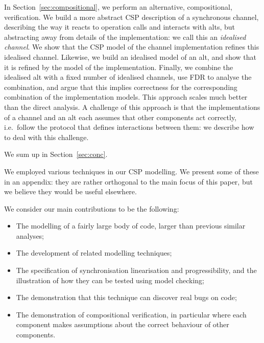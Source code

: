 In Section~\ref{sec:compositional}, we perform an alternative, compositional,
verification.  We build a more abstract CSP description of a synchronous
channel, describing the way it reacts to operation calls and interacts with
alts, but abstracting away from details of the implementation: we call this an
\emph{idealised channel}.  We show that the CSP model of the channel
implementation refines this idealised channel.  Likewise, we build an
idealised model of an alt, and show that it is refined by the model of the
implementation.  Finally, we combine the idealised alt with a fixed number of
idealised channels, use FDR to analyse the combination, and argue that this
implies correctness for the corresponding combination of the implementation
models.  This approach scales much better than the direct analysis.  A
challenge of this approach is that the implementations of a channel and an alt
each assumes that other components act correctly, i.e.~follow the protocol
that defines interactions between them: we describe how to deal with this
challenge.

We sum up in Section~\ref{sec:conc}.

We employed various techniques in our CSP modelling.  We present some of these
in an appendix: they are rather orthogonal to the main focus of this paper,
but we believe they would be useful elsewhere.

We consider our main contributions to be the following:
%
\begin{itemize}
\item The modelling of a fairly large body of code, larger than previous
  similar analyses;

\item The development of related modelling techniques;

\item The specification of synchronisation linearisation and progressibility,
  and the illustration of how they can be tested using model checking; 

\item The demonstration that this technique can discover real bugs on code;

\item The demonstration of compositional verification, in particular where
  each component makes assumptions about the correct behaviour of other
  components. 
\end{itemize}



